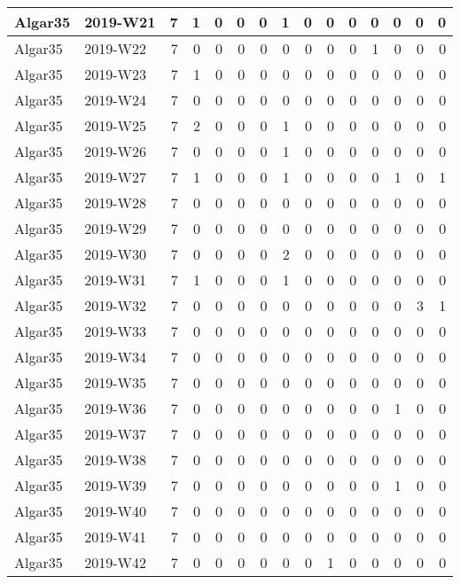 \documentclass[]{book}
\begin{document}
\begin{table}
\begin{tabular}[t]{l|l|r|r|r|r|r|r|r|r|r|r|r|r|r}
\hline
Algar35 & 2019-W21 & 7 & 1 & 0 & 0 & 0 & 1 & 0 & 0 & 0 & 0 & 0 & 0 & 0\\
\hline
Algar35 & 2019-W22 & 7 & 0 & 0 & 0 & 0 & 0 & 0 & 0 & 0 & 1 & 0 & 0 & 0\\
\hline
Algar35 & 2019-W23 & 7 & 1 & 0 & 0 & 0 & 0 & 0 & 0 & 0 & 0 & 0 & 0 & 0\\
\hline
Algar35 & 2019-W24 & 7 & 0 & 0 & 0 & 0 & 0 & 0 & 0 & 0 & 0 & 0 & 0 & 0\\
\hline
Algar35 & 2019-W25 & 7 & 2 & 0 & 0 & 0 & 1 & 0 & 0 & 0 & 0 & 0 & 0 & 0\\
\hline
Algar35 & 2019-W26 & 7 & 0 & 0 & 0 & 0 & 1 & 0 & 0 & 0 & 0 & 0 & 0 & 0\\
\hline
Algar35 & 2019-W27 & 7 & 1 & 0 & 0 & 0 & 1 & 0 & 0 & 0 & 0 & 1 & 0 & 1\\
\hline
Algar35 & 2019-W28 & 7 & 0 & 0 & 0 & 0 & 0 & 0 & 0 & 0 & 0 & 0 & 0 & 0\\
\hline
Algar35 & 2019-W29 & 7 & 0 & 0 & 0 & 0 & 0 & 0 & 0 & 0 & 0 & 0 & 0 & 0\\
\hline
Algar35 & 2019-W30 & 7 & 0 & 0 & 0 & 0 & 2 & 0 & 0 & 0 & 0 & 0 & 0 & 0\\
\hline
Algar35 & 2019-W31 & 7 & 1 & 0 & 0 & 0 & 1 & 0 & 0 & 0 & 0 & 0 & 0 & 0\\
\hline
Algar35 & 2019-W32 & 7 & 0 & 0 & 0 & 0 & 0 & 0 & 0 & 0 & 0 & 0 & 3 & 1\\
\hline
Algar35 & 2019-W33 & 7 & 0 & 0 & 0 & 0 & 0 & 0 & 0 & 0 & 0 & 0 & 0 & 0\\
\hline
Algar35 & 2019-W34 & 7 & 0 & 0 & 0 & 0 & 0 & 0 & 0 & 0 & 0 & 0 & 0 & 0\\
\hline
Algar35 & 2019-W35 & 7 & 0 & 0 & 0 & 0 & 0 & 0 & 0 & 0 & 0 & 0 & 0 & 0\\
\hline
Algar35 & 2019-W36 & 7 & 0 & 0 & 0 & 0 & 0 & 0 & 0 & 0 & 0 & 1 & 0 & 0\\
\hline
Algar35 & 2019-W37 & 7 & 0 & 0 & 0 & 0 & 0 & 0 & 0 & 0 & 0 & 0 & 0 & 0\\
\hline
Algar35 & 2019-W38 & 7 & 0 & 0 & 0 & 0 & 0 & 0 & 0 & 0 & 0 & 0 & 0 & 0\\
\hline
Algar35 & 2019-W39 & 7 & 0 & 0 & 0 & 0 & 0 & 0 & 0 & 0 & 0 & 1 & 0 & 0\\
\hline
Algar35 & 2019-W40 & 7 & 0 & 0 & 0 & 0 & 0 & 0 & 0 & 0 & 0 & 0 & 0 & 0\\
\hline
Algar35 & 2019-W41 & 7 & 0 & 0 & 0 & 0 & 0 & 0 & 0 & 0 & 0 & 0 & 0 & 0\\
\hline
Algar35 & 2019-W42 & 7 & 0 & 0 & 0 & 0 & 0 & 0 & 1 & 0 & 0 & 0 & 0 & 0\\

\end{tabular}
\end{table}
\end{document}

